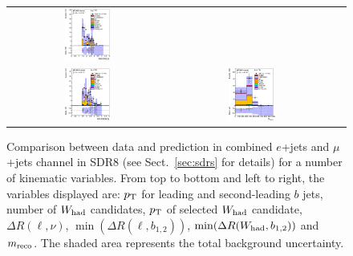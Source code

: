 \begin{figure}[htbp]
\begin{center}
\begin{tabular}{ccc}
\includegraphics[width=0.30\textwidth]{appendices/figures/sdrs/VLQAna_WbX_MinDRlb_ELEMUONCR8_1W_NOMINAL.eps} \\
\includegraphics[width=0.30\textwidth]{appendices/figures/sdrs/VLQAna_WbX_MinDRWb_ELEMUONCR8_1W_NOMINAL.eps} &
\includegraphics[width=0.30\textwidth]{appendices/figures/sdrs/VLQAna_WbX_1W_MWb_4_ELEMUONCR8_1W_NOMINAL.eps} & \\
\end{tabular}\caption{\small {Comparison between data and prediction in combined $e$+jets and $\mu$+jets channel in SDR8 (see Sect.~\ref{sec:sdrs} for details) 
for a number of kinematic variables. From top to bottom and left to right, the variables displayed are: $\pt$ for leading and second-leading $b$ jets,
number of $W_{\rm had}$  candidates, $\pt$ of selected $W_{\rm had}$  candidate, $\Delta R(\ell,\nu)$, $\min(\Delta R(\ell, b_{1,2}))$, 
$\min(\Delta R(W_{\rm had}, b_{1,2}))$ and $m_{\rm reco}$.
The shaded area represents the total background uncertainty.}}
\label{fig:ELEMUONCR8_3}
\end{center}
\end{figure}                                                                             
